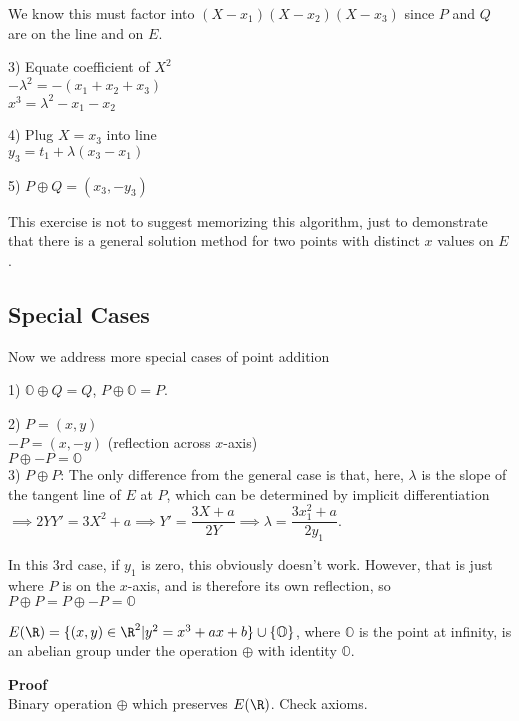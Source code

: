 \documentclass[twoside, 10pt]{article}
\renewcommand{\O}{\mathbb{O}}
\begin{document}
We know this must factor into $(X-x_1)(X-x_2)(X-x_3)$ since $P$ and $Q$ are on the line and on $E$.

3) Equate coefficient of $X^2$\\
$-\lambda^2 = -(x_1 + x_2 + x_3)$\\
$x^3 = \lambda^2 - x_1 - x_2$

4) Plug $X = x_3$ into line\\
$y_3 = t_1 + \lambda(x_3 - x_1)$

5) $P\oplus Q = (x_3, -y_3)$

\begin{rmk}
    This exercise is not to suggest memorizing this algorithm, just to demonstrate that there is a general solution method for two points with distinct $x$ values on $E$.
\end{rmk}

\subsection{Special Cases} Now we address more special cases of point addition

1) $\O \oplus Q = Q$, $P \oplus \O = P$.

2) $P = (x, y)$\\
$-P = (x, -y)$ (reflection across $x$-axis)\\
$P \oplus -P = \O$\\

3) $P \oplus P$: The only difference from the general case is that, here, $\lambda$ is the slope of the tangent line of $E$ at $P$, which can be determined by implicit differentiation $\implies 2YY' = 3X^2 + a \implies Y'  = \dfrac{3X + a}{2Y} \implies \lambda = \dfrac{3x_1^2 + a}{2y_1}$. 

\begin{rmk}
    In this 3rd case, if $y_1$ is zero, this obviously doesn't work. However, that is just where $P$ is on the $x$-axis, and is therefore its own reflection, so $P \oplus P = P \oplus -P = \O$
\end{rmk}

\begin{prop}
    $E(\R) = \{(x, y) \in \R^2 | y^2 = x^3 + ax + b\} \cup \{\O\}$, where $\O$ is the point at infinity, is an abelian group under the operation $\oplus$ with identity $\O$. 
\end{prop}
\textbf{Proof}\\
Binary operation $\oplus$ which preserves $E(\R)$. Check axioms.
\end{document}
